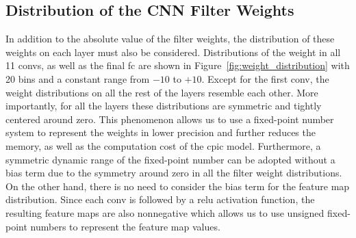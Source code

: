 \documentclass{article}
\begin{document}
\subsection{Distribution of the CNN Filter Weights}
\label{sec:weight_distribution}
%
In addition to the absolute value of the filter weights, the distribution of these weights on each layer must also be considered.
Distributions of the weight in all 11 \glspl{conv}, as well as the final \gls{fc} are shown in Figure~\ref{fig:weight_distribution} with 20 bins and a constant range from $-10$ to $+10$.
Except for the first \gls{conv}, the weight distributions on all the rest of the layers resemble each other.
More importantly, for all the layers these distributions are symmetric and tightly centered around zero.
This phenomenon allows us to use a fixed-point number system to represent the weights in lower precision and further reduces the memory, as well as the computation cost of the \gls{cpic} model.
Furthermore, a symmetric dynamic range of the fixed-point number can be adopted without a bias term due to the symmetry around zero in all the filter weight distributions.
On the other hand, there is no need to consider the bias term for the feature map distribution.
Since each \gls{conv} is followed by a \gls{relu} activation function, the resulting feature maps are also nonnegative which allows us to use unsigned fixed-point numbers to represent the feature map values.
%
\end{document}
